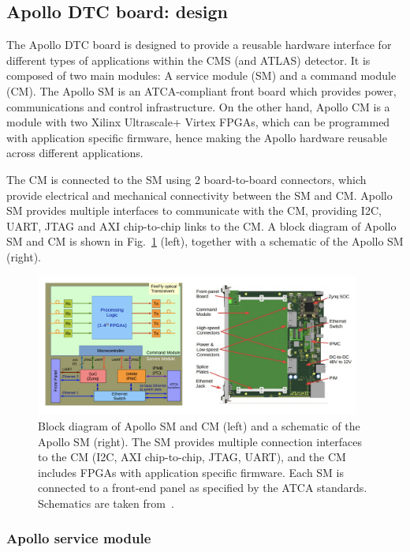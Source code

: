 \subsection{Apollo DTC board: design}

The Apollo DTC board is designed to provide a reusable hardware interface for different types of applications within the
CMS (and ATLAS) detector. It is composed of two main modules: A service module (SM) and a command module (CM).
The Apollo SM is an ATCA-compliant front board which provides power, communications and control infrastructure.
On the other hand, Apollo CM is a module with two Xilinx Ultrascale+ Virtex FPGAs, which can be programmed with
application specific firmware, hence making the Apollo hardware reusable across different applications. 

The CM is connected to the SM using 2 board-to-board connectors, which provide electrical and mechanical 
connectivity between the SM and CM. Apollo SM provides multiple interfaces to communicate with the CM,
providing I2C, UART, JTAG and AXI chip-to-chip links to the CM.
A block diagram of Apollo SM and CM is shown in Fig.~\ref{fig:apollo_schematic} (left), together with
a schematic of the Apollo SM (right).

\begin{figure}[htbp]
    \centering
    \includegraphics[width=0.95\textwidth]{TrackerUpgrade/Apollo/apollo_schematic.png}
    \caption{Block diagram of Apollo SM and CM (left) and a schematic of the Apollo SM (right). The SM provides
    multiple connection interfaces to the CM (I2C, AXI chip-to-chip, JTAG, UART), and the CM includes FPGAs with
    application specific firmware. Each SM is connected to a front-end panel as specified by the ATCA standards. 
    Schematics are taken from~\cite{CMS:ApolloPaper}.}
    \label{fig:apollo_schematic}
\end{figure}

\subsubsection{Apollo service module}

